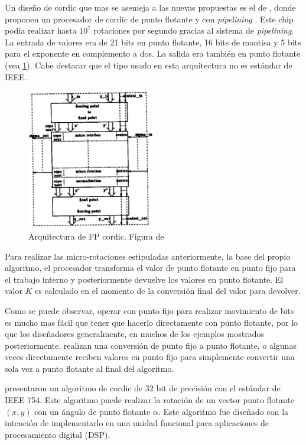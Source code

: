 Un diseño de \gls{cordic} que mas se asemeja a las nuevas propuestas es el de \cite{de_lange_optimal_1988}, donde proponen un procesador de \gls{cordic} de punto flotante y con \textit{pipelining} . Este chip podía realizar hasta $10^7$ rotaciones por segundo gracias al sistema de \textit{pipelining}. La entrada de valores era de 21 bits en punto flotante, 16 bits de mantisa y 5 bits para el exponente en complemento a dos. La salida era también en punto flotante (vea \ref{graf:Arq_FP_CORDIC}). Cabe destacar que el tipo usado en esta arquitectura no es estándar de IEEE.

\begin{figure}[ht]
	\centering
	\includegraphics[width=0.5\textwidth]{archivos/CORDIC/1988_FP_CORDIC_Architecture.png}
	\caption{Arquitectura de FP \gls{cordic}. Figura de \cite{de_lange_optimal_1988}}
	\label{graf:Arq_FP_CORDIC}
\end{figure}

Para realizar las micro-rotaciones estipuladas anteriormente, la base del propio algoritmo, el procesador transforma el valor de punto flotante en punto fijo para el trabajo interno y posteriormente devuelve los valores en punto flotante. El valor $K$ es calculado en el momento de la conversión final del valor para devolver.

Como se puede observar, operar con punto fijo para realizar movimiento de bits es mucho mas fácil que tener que hacerlo directamente con punto flotante, por lo que los diseñadores generalmente, en muchos de los ejemplos mostrados posteriormente, realizan una conversión de punto fijo a punto flotante, o algunas veces directamente reciben valores en punto fijo para simplemente convertir una sola vez a punto flotante al final del algoritmo.

\cite{hekstra_floating_1993} presentaron un algoritmo de \gls{cordic} de 32 bit de precisión con el estándar de IEEE 754. Este algoritmo puede realizar la rotación de un vector punto flotante $(x,y)$ con un ángulo de punto flotante $\alpha$. Este algoritmo fue diseñado con la intención de implementarlo en una unidad funcional para aplicaciones de procesamiento digital (DSP).

